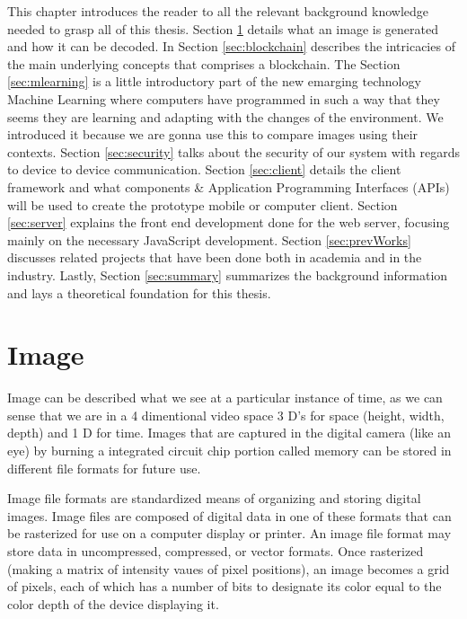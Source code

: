 This chapter introduces the reader to all the relevant background knowledge needed to grasp all of this thesis.
Section \ref{sec:image} details what an image is generated and how it can be decoded.
In Section \ref{sec:blockchain} describes the intricacies of the main underlying concepts that comprises a blockchain.
The Section \ref{sec:mlearning} is a little introductory part of the new emarging technology Machine Learning where computers have programmed in such a way that they seems they are learning and adapting with the changes of the environment. We introduced it because we are gonna use this to compare images using their contexts.
Section \ref{sec:security} talks about the security of our system with regards to device to device communication.
Section \ref{sec:client} details the client framework and what components \& Application Programming Interfaces (APIs) will be used to create the prototype mobile or computer client.
Section \ref{sec:server} explains the front end development done for the web server, focusing mainly on the necessary JavaScript development.
Section \ref{sec:prevWorks} discusses related projects that have been done
both in academia and in the industry.
Lastly, Section \ref{sec:summary} summarizes the background information and lays a theoretical foundation for this thesis.

\section{Image}
\label{sec:image}
Image can be described what we see at a particular instance of time, as we can sense that we are in a 4 dimentional video space 3 D's for space (height, width, depth) and 1 D for time. Images that are captured in the digital camera (like an eye) by burning a integrated circuit chip portion called memory can be stored in different file formats for future use.

Image file formats are standardized means of organizing and storing digital images. Image files are composed of digital data in one of these formats that can be rasterized for use on a computer display or printer. An image file format may store data in uncompressed, compressed, or vector formats. Once rasterized (making a matrix of intensity vaues of pixel positions), an image becomes a grid of pixels, each of which has a number of bits to designate its color equal to the color depth of the device displaying it.

